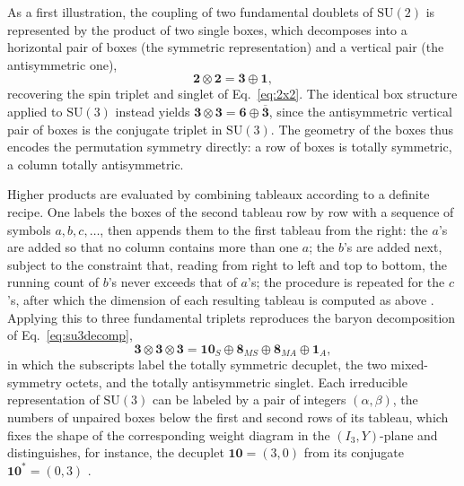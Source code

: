 As a first illustration, the coupling of two fundamental doublets of $\mathrm{SU}(2)$
is represented by the product of two single boxes, which decomposes into a
horizontal pair of boxes (the symmetric representation) and a vertical pair (the
antisymmetric one),
\begin{equation}
    \mathbf{2} \otimes \mathbf{2} = \mathbf{3} \oplus \mathbf{1},
\end{equation}
recovering the spin triplet and singlet of Eq.~\eqref{eq:2x2}. The identical box
structure applied to $\mathrm{SU}(3)$ instead yields $\mathbf{3} \otimes \mathbf{3} =
\mathbf{6} \oplus \overline{\mathbf{3}}$, since the antisymmetric vertical pair of boxes is
the conjugate triplet in $\mathrm{SU}(3)$. The geometry of the boxes thus encodes the
permutation symmetry directly: a row of boxes is totally symmetric, a column totally
antisymmetric.

Higher products are evaluated by combining tableaux according to a definite recipe.
One labels the boxes of the second tableau row by row with a sequence of symbols
$a, b, c, \dots$, then appends them to the first tableau from the right: the $a$'s
are added so that no column contains more than one $a$; the $b$'s are added next,
subject to the constraint that, reading from right to left and top to bottom, the
running count of $b$'s never exceeds that of $a$'s; the procedure is repeated for the
$c$'s, after which the dimension of each resulting tableau is computed as above
\cite[Ch.~6]{Amsler2018}. Applying this to three fundamental triplets reproduces the
baryon decomposition of Eq.~\eqref{eq:su3decomp},
\begin{equation}
    \mathbf{3} \otimes \mathbf{3} \otimes \mathbf{3}
    = \mathbf{10}_S \oplus \mathbf{8}_{MS} \oplus \mathbf{8}_{MA} \oplus \mathbf{1}_A ,
\end{equation}
in which the subscripts label the totally symmetric decuplet, the two mixed-symmetry
octets, and the totally antisymmetric singlet. Each irreducible representation of
$\mathrm{SU}(3)$ can be labeled by a pair of integers $(\alpha, \beta)$, the numbers
of unpaired boxes below the first and second rows of its tableau, which fixes the
shape of the corresponding weight diagram in the $(I_3, Y)$-plane and distinguishes,
for instance, the decuplet $\mathbf{10} = (3,0)$ from its conjugate $\mathbf{10}^* =
(0,3)$ \cite[Ch.~6]{Amsler2018}.

